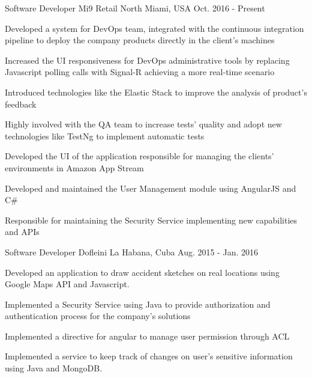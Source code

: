 

\begin{cventries}


\cventry
{Software Developer} %
{Mi9 Retail} %
{North Miami, USA} %
{Oct. 2016 - Present} %
{ %
\begin{cvitems}
    \item {Developed a system for DevOps team, integrated with the continuous integration pipeline to deploy the company products directly in the client's machines}
    \item {Increased the UI responsiveness for DevOps administrative tools by replacing Javascript polling calls with Signal-R achieving a more real-time scenario}
    \item {Introduced technologies like the Elastic Stack to improve the analysis of  product's feedback}  
    \item {Highly involved with the QA team to increase tests' quality and adopt new technologies like TestNg to implement automatic tests}
    \item {Developed the UI of the application responsible for managing the clients' environments in Amazon App Stream}
    \item {Developed and maintained the User Management module using AngularJS and C\#}
    \item {Responsible for maintaining the Security Service implementing new capabilities and APIs}
\end{cvitems}
}

\cventry
{Software Developer} %
{Dofleini} %
{La Habana, Cuba} %
{Aug. 2015 - Jan. 2016} %
{ %
\begin{cvitems}
	\item {Developed an application to draw accident sketches on real locations using Google Maps API and
		Javascript.}
	\item {Implemented a Security Service using Java to provide authorization and authentication
	process for the company's solutions}
	\item {Implemented a directive for angular to manage user permission through ACL}
	\item {Implemented a service to keep track of changes on user's sensitive information using Java and MongoDB.}
\end{cvitems}
}


\end{cventries}
